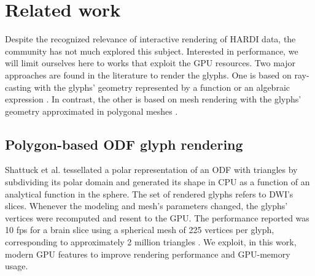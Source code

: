 \documentclass[twoside,twocolumn,10pt]{article}
\begin{document}

\section{Related work}
\label{sec::related_work}



 Despite the recognized relevance of interactive rendering of HARDI data, the community has not much explored this subject. Interested in performance, we will limit ourselves here to works that exploit the GPU resources. Two major approaches are found in the literature to render the glyphs. One is based on ray-casting with the glyphs' geometry represented by a function or an algebraic expression \cite{peeters2009, almsick2011}. In contrast, the other is based on mesh rendering with the glyphs' geometry approximated in polygonal meshes \cite{shattuck2008}.
 
 \subsection{Polygon-based ODF glyph rendering}

Shattuck et al. \cite{shattuck2008} tessellated a polar representation of an ODF with triangles by subdividing its polar domain and generated its shape in CPU as a function of an analytical function in the sphere. The set of rendered glyphs refers to DWI's slices. Whenever the modeling and mesh's parameters changed, the glyphs' vertices were recomputed and resent to the GPU. The performance reported was 10 fps for a brain slice using a spherical mesh of 225 vertices per glyph, corresponding to approximately 2 million triangles . We exploit, in this work, modern GPU features to improve rendering performance and GPU-memory usage. %
\end{document}
